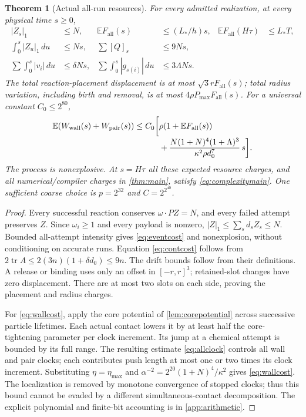 \documentclass[11pt]{article}
\numberwithin{equation}{section}
\newtheorem{theorem}{Theorem}[section]
\theoremstyle{definition}
\theoremstyle{remark}\newtheorem{remark}[theorem]{Remark}
\newcommand{\E}{\mathbb E}
\newcommand{\tr}{\operatorname{tr}}
\newcommand{\Ff}{F_{\mathrm{all}}}
\newcommand{\dd}{\,d}
\begin{document}
\begin{theorem}[Actual all-run resources]\label{thm:resources}
For every admitted realization, at every physical time $s\ge0$,
\begin{align}
 |Z_s|_1&\le N, &
 \E\Ff(s)&\le(L_*/h)s, &
 \E\Ff(H\tau)&\le L_*T,\label{eq:eventcost}\\
 \int_0^s|Z_u|_1\dd u&\le Ns, &
 \sum[Q]_s&\le9Ns,\label{eq:contcost}\\
 \sum\int_0^s|v_i|\dd u&\le\delta Ns, &
 \sum\int_0^s|g_{s(i)}|\dd u&\le3\Lambda Ns.
 \label{eq:driftcost}
\end{align}
The total reaction-placement displacement is at most
$\sqrt3r\Ff(s)$; total radius variation, including birth and removal,
is at most $4\rho P_{\max}\Ff(s)$. For a universal constant
$C_0\le2^{80}$,
\begin{align}
 \E(W_{\rm wall}(s)+W_{\rm pair}(s))\le C_0\biggl[
 &\rho(1+\E\Ff(s))\nonumber\\[-2pt]
 &+\frac{N(1+N)^4(1+\Lambda)^3}
             {\kappa^2\rho d_0^7}\,s\biggr].\label{eq:wallcost}
\end{align}
The process is nonexplosive. At $s=H\tau$ all these expected resource
charges, and all numerical/compiler charges in \cref{thm:main}, satisfy
\eqref{eq:complexitymain}. One sufficient coarse choice is
$p=2^{32}$ and $C=2^{2^{40}}$.
\end{theorem}
\begin{proof}
Every successful reaction conserves $\omega\cdot PZ=N$, and every failed
attempt preserves $Z$. Since $\omega_i\ge1$ and every payload is nonzero,
$|Z|_1\le\sum_sd_sZ_s\le N$. Bounded all-attempt intensity gives
\eqref{eq:eventcost} and nonexplosion, without conditioning on accurate
runs. Equation \eqref{eq:contcost} follows from
$2\tr A\le2(3n)(1+\delta d_0)\le9n$.
The drift bounds follow from their definitions. A release or binding uses
only an offset in $[-r,r]^3$; retained-slot changes have zero displacement.
There are at most two slots on each side, proving the placement and radius
charges.

For \eqref{eq:wallcost}, apply the core potential of
\cref{lem:corepotential} across successive particle lifetimes. Each actual
contact lowers it by at least half the core-tightening parameter per clock
increment. Its jump at a chemical attempt is bounded by its full range.
The resulting estimate \eqref{eq:allclock} controls all wall and pair
clocks; each contributes push length at most one or two times its clock
increment. Substituting $\eta=\eta_{\max}$ and
$\alpha^{-2}=2^{20}(1+N)^4/\kappa^2$ gives
\eqref{eq:wallcost}. The localization is removed by monotone convergence
of stopped clocks; thus this bound cannot be evaded by a different
simultaneous-contact decomposition. The explicit polynomial and finite-bit
accounting is in \cref{app:arithmetic}.
\end{proof}
\end{document}

